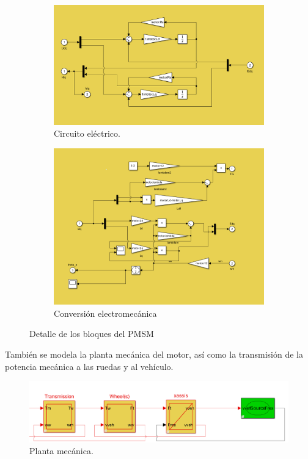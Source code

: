 \begin{figure}[H]
    \centering
    \begin{subfigure}{0.52\linewidth}
        \includegraphics[width=\linewidth]{fig/motorEMR2.png}
        \caption{Circuito eléctrico.}
    \end{subfigure}
    \begin{subfigure}{0.4\linewidth}
        \includegraphics[width=\linewidth]{fig/motorEMR3.png}
        \caption{Conversión electromecánica}
    \end{subfigure}
    \caption{Detalle de los bloques del PMSM}
\end{figure}

También se modela la planta mecánica del motor, así como la transmisión de la potencia mecánica a las ruedas y al vehículo.

\begin{figure}[H]
    \centering
    \includegraphics[width=0.95\linewidth]{fig/carEMR.png}
    \caption{Planta mecánica.}
\end{figure}

